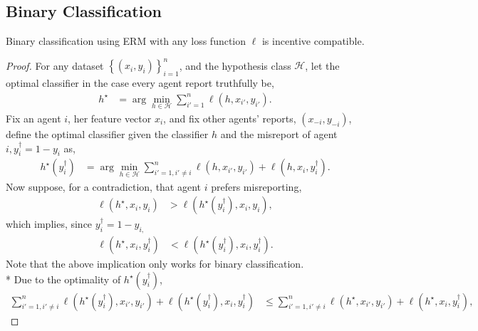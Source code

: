 \documentclass{article}
\begin{document}
\subsection{Binary Classification}
\begin{prop} \label{prop:bin} 
Binary classification using ERM with any loss function $\ell$ is incentive compatible.
\end{prop}
\begin{proof} \label{proof:binpf} 
For any dataset $\left\{\left(x_{i}, y_{i}\right)\right\}_{i=1}^{n}$, and the hypothesis class $\mathcal{H}$, let the optimal classifier in the case every agent report truthfully be,
\begin{align*}
h^\star  &= \arg\displaystyle\min_{h \in \mathcal{H}} \displaystyle\sum_{i'=1}^{n} \ell\left(h, x_{i'}, y_{i'}\right).
\end{align*}
Fix an agent $i $, her feature vector $x_{i}$, and fix other agents' reports, $\left(x_{-i}, y_{-i}\right)$, define the optimal classifier given the classifier $h $ and the misreport of agent $i , y^{\dagger}_{i} = 1 - y_{i}$ as,
\begin{align*}
h^\star \left(y^{\dagger}_{i}\right) &= \arg\displaystyle\min_{h \in \mathcal{H}} \displaystyle\sum_{i'=1, i' \neq  i}^{n} \ell\left(h, x_{i'}, y_{i'}\right) + \ell\left(h, x_{i}, y^{\dagger}_{i}\right).
\end{align*}
Now suppose, for a contradiction, that agent $i $ prefers misreporting,
\begin{align*}
\ell\left(h^\star , x_{i}, y_{i}\right) &> \ell\left(h^\star \left(y^{\dagger}_{i}\right), x_{i}, y_{i}\right),
\end{align*}
which implies, since $y^{\dagger}_{i} = 1 - y_{i,}$
\begin{align*}
\ell\left(h^\star , x_{i}, y^{\dagger}_{i}\right) &< \ell\left(h^\star \left(y^{\dagger}_{i}\right), x_{i}, y^{\dagger}_{i}\right).
\end{align*}
Note that the above implication only works for binary classification.
\\* Due to the optimality of $h^\star \left(y^{\dagger}_{i}\right)$,
\begin{align*}
\displaystyle\sum_{i'=1, i' \neq  i}^{n} \ell\left(h^\star \left(y^{\dagger}_{i}\right), x_{i'}, y_{i'}\right) + \ell\left(h^\star \left(y^{\dagger}_{i}\right), x_{i}, y^{\dagger}_{i}\right) &\leq  \displaystyle\sum_{i'=1, i' \neq  i}^{n} \ell\left(h^\star , x_{i'}, y_{i'}\right) + \ell\left(h^\star , x_{i}, y^{\dagger}_{i}\right),
\end{align*}

\end{proof}
\end{document}
